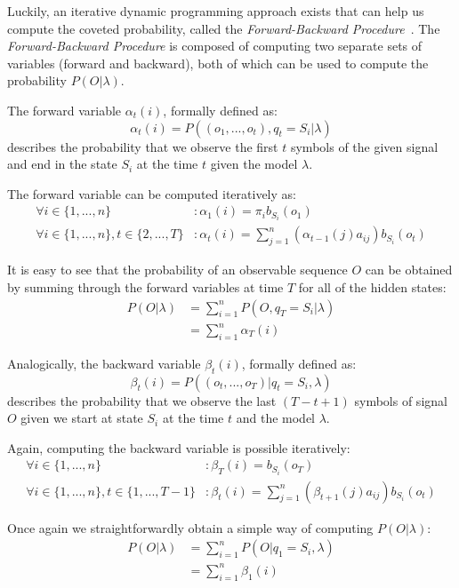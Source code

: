 \documentclass[a4paper,12pt]{article}
\begin{document}
Luckily, an iterative dynamic programming approach exists that can help us compute the coveted probability, called the \emph{Forward-Backward Procedure}~\cite{baum1967, baum1968}. The \emph{Forward-Backward Procedure} is composed of computing two separate sets of variables (forward and backward), both of which can be used to compute the probability $P(O|\lambda)$.

The forward variable $\alpha_t(i)$, formally defined as: $$\alpha_t(i)=P((o_1, ..., o_t), q_t=S_i|\lambda)$$ describes the probability that we observe the first $t$ symbols of the given signal and end in the state $S_i$ at the time $t$ given the model $\lambda$.

The forward variable can be computed iteratively as:
\begin{align*}
\forall i\in \{1, ..., n\}&: \alpha_1(i)=\pi_ib_{S_i}(o_1)\\
\forall i\in \{1, ..., n\}, t\in\{2, ..., T\}&: \alpha_t(i) = \sum_{j=1}^n{(\alpha_{t-1}(j)a_{ij})}b_{S_i}(o_t)
\end{align*}

It is easy to see that the probability of an observable sequence $O$ can be obtained by summing through the forward variables at time $T$ for all of the hidden states:
\begin{align*}
P(O|\lambda) &= \sum_{i=1}^n{P(O, q_T=S_i|\lambda)}\\
&= \sum_{i=1}^n{\alpha_T(i)}
\end{align*}

Analogically, the backward variable $\beta_t(i)$, formally defined as: $$\beta_t(i)=P((o_t, ..., o_T)| q_t=S_i, \lambda)$$ describes the probability that we observe the last $(T-t+1)$ symbols of signal $O$ given we start at state $S_i$ at the time $t$ and the model $\lambda$.

Again, computing the backward variable is possible iteratively:
\begin{align*}
\forall i\in \{1, ..., n\}&:\beta_T(i)=b_{S_i}(o_T)\\
\forall i\in\{1, ..., n\}, t\in\{1, ..., T-1\}&:\beta_t(i)=\sum_{j=1}^n{(\beta_{t+1}(j)a_{ij})}b_{S_i}(o_t)
\end{align*}

Once again we straightforwardly obtain a simple way of computing $P(O|\lambda)$:
\begin{align*}
P(O|\lambda) &= \sum_{i=1}^n{P(O|q_1=S_i, \lambda)}\\
&= \sum_{i=1}^n{\beta_1(i)}
\end{align*}
\end{document}
